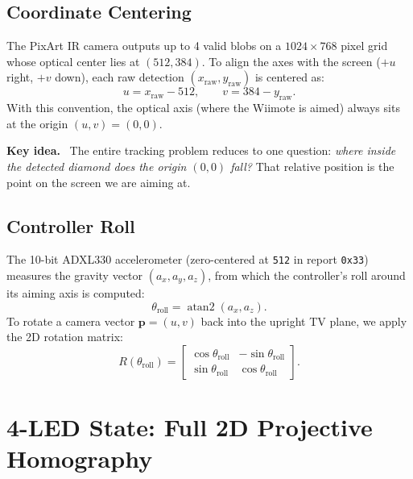 \documentclass[11pt,a4paper]{article}
\newcommand{\vect}[1]{\mathbf{#1}}
\newcommand{\code}[1]{\texttt{#1}}
\DeclareMathOperator{\atantwo}{atan2}
\newenvironment{idea}
  {\par\medskip\noindent\begingroup\color{blue!50!black}\textbf{Key idea.}\ }
  {\endgroup\par\medskip}
\begin{document}
\subsection{Coordinate Centering}

The PixArt IR camera outputs up to 4 valid blobs on a $1024 \times 768$ pixel
grid whose optical center lies at $(512, 384)$. To align the axes with the
screen ($+u$ right, $+v$ down), each raw detection $(x_{\text{raw}},
y_{\text{raw}})$ is centered as:
\begin{equation}
  u = x_{\text{raw}} - 512, \qquad v = 384 - y_{\text{raw}} .
\end{equation}
With this convention, the optical axis (where the Wiimote is aimed) always sits
at the origin $(u,v) = (0,0)$.

\begin{idea}
The entire tracking problem reduces to one question: \emph{where inside the
detected diamond does the origin $(0,0)$ fall?} That relative position is the
point on the screen we are aiming at.
\end{idea}

\subsection{Controller Roll}

The 10-bit ADXL330 accelerometer (zero-centered at \code{512} in report
\code{0x33}) measures the gravity vector $(a_x, a_y, a_z)$, from which the
controller's roll around its aiming axis is computed:
\begin{equation}
  \theta_{\text{roll}} = \atantwo(a_x, a_z) .
\end{equation}
To rotate a camera vector $\vect{p} = (u,v)$ back into the upright TV plane,
we apply the 2D rotation matrix:
\begin{equation}
  R(\theta_{\text{roll}}) =
  \begin{bmatrix}
    \cos\theta_{\text{roll}} & -\sin\theta_{\text{roll}} \\
    \sin\theta_{\text{roll}} &  \cos\theta_{\text{roll}}
  \end{bmatrix}.
\end{equation}

\section{4-LED State: Full 2D Projective Homography}
\label{sec:four}
\end{document}
